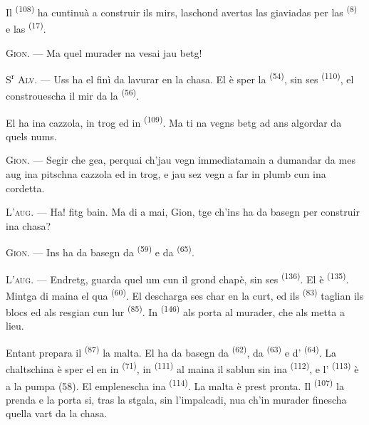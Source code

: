 Il  \textsuperscript{(108)} ha cuntinuà a construir ils mirs, laschond
avertas las giaviadas per las  \textsuperscript{(8)} e las
 \textsuperscript{(17)}.

\textsc{Gion}. --- Ma quel murader na vesai jau betg!

S\textsuperscript{r} \textsc{Alv}. --- Uss ha el finì da lavurar en la chasa. El è
sper la  \textsuperscript{(54)}, sin ses 
\textsuperscript{(110)}, el constrouescha il mir da la 
\textsuperscript{(56)}.

El ha ina cazzola, in trog ed in  \textsuperscript{(109)}. Ma ti na
vegns betg ad ans algordar da quels nums.

\textsc{Gion}. --- Segir che gea, perquai ch'jau vegn immediatamain a dumandar da
mes aug ina pitschna cazzola ed in trog, e jau sez vegn a far in plumb cun ina
cordetta.

\VUsaut{3.0mm}
\VUsaut{3.0mm}

\textsc{L'aug}. --- Ha! fitg bain. Ma di a mai, Gion, tge ch'ins ha da basegn per
construir ina chasa?

\textsc{Gion}. --- Ins ha da basegn da  \textsuperscript{(59)} e
da  \textsuperscript{(65)}.

\textsc{L'aug}. --- Endretg, guarda quel um cun il grond chapè, sin ses 
\textsuperscript{(136)}. El è  \textsuperscript{(135)}. Mintga di
maina el qua  \textsuperscript{(60)}. El descharga ses char en
la curt, ed ils  \textsuperscript{(83)} taglian ils blocs ed als
resgian cun lur  \textsuperscript{(85)}. In 
\textsuperscript{(146)} als porta al murader, che als metta a lieu.

Entant prepara il  \textsuperscript{(87)} la malta. El ha da basegn
da  \textsuperscript{(62)}, da 
\textsuperscript{(63)} e d' \textsuperscript{(64)}. La chaltschina è sper el
en in  \textsuperscript{(71)}, in 
\textsuperscript{(111)} al maina il sablun sin ina 
\textsuperscript{(112)}, e l' \textsuperscript{(113)} è a la pumpa
(58). El emplenescha ina  \textsuperscript{(114)}. La malta è prest
pronta. Il  \textsuperscript{(107)} la prenda e la porta si,
tras la stgala, sin l'impalcadi, nua ch'in murader finescha quella vart da la
chasa.

